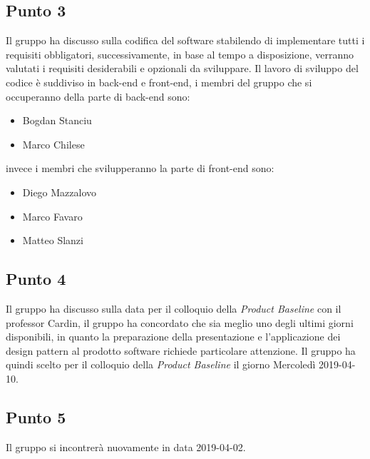 \subsection{Punto 3}
Il gruppo ha discusso sulla codifica del software stabilendo di implementare tutti i requisiti obbligatori, successivamente, in base al tempo a disposizione, verranno valutati i requisiti desiderabili e opzionali da sviluppare. Il lavoro di sviluppo del codice è suddiviso in back-end e front-end, i membri del gruppo che si occuperanno della parte di back-end sono:
\begin{itemize}
	\item Bogdan Stanciu
	\item Marco Chilese
\end{itemize}
invece i membri che svilupperanno la parte di front-end sono:
\begin{itemize}
	\item Diego Mazzalovo
	\item Marco Favaro
	\item Matteo Slanzi
\end{itemize}
	
\subsection{Punto 4}
Il gruppo ha discusso sulla data per il colloquio della \textit{Product Baseline} con il professor Cardin, il gruppo ha concordato che sia meglio uno degli ultimi giorni disponibili, in quanto la preparazione della presentazione e l'applicazione dei design pattern al prodotto software richiede particolare attenzione.
Il gruppo ha quindi scelto per il colloquio della \textit{Product Baseline} il giorno Mercoledì 2019-04-10.
	
\subsection{Punto 5}
Il gruppo si incontrerà nuovamente in data 2019-04-02.